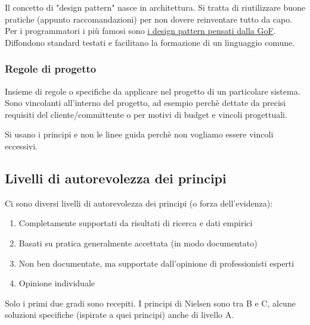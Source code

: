 \documentclass[11pt,a4paper]{book}
\begin{document}
Il concetto di "design pattern" nasce in architettura. Si tratta di riutilizzare buone pratiche (appunto raccomandazioni) per non dovere reinventare tutto da capo. Per i programmatori i più famosi sono \href{https://refactoring.guru/design-patterns}{i design pattern pensati dalla GoF}. Diffondono standard testati e facilitano la formazione di un linguaggio comune.

\subsubsection{Regole di progetto}
Insieme di regole o specifiche da applicare nel progetto di un particolare sistema. Sono vincolanti all'interno del progetto, ad esempio perchè dettate da precisi requisiti del cliente/committente o per motivi di budget e vincoli progettuali.


Si usano i principi e non le linee guida perchè non vogliamo essere vincoli eccessivi. 
\subsection{Livelli di autorevolezza dei principi}
Ci sono diversi livelli di autorevolezza dei principi (o forza dell'evidenza):
\begin{enumerate}
	\item Completamente supportati da risultati di ricerca e dati empirici
	\item Basati su pratica generalmente accettata (in modo documentato)
	\item Non ben documentate, ma supportate dall'opinione di professionisti esperti
	\item Opinione individuale
\end{enumerate}

Solo i primi due gradi sono recepiti. I principi di Nielsen sono tra B e C, alcune soluzioni specifiche (ispirate a quei principi) anche di livello A.
\end{document}
